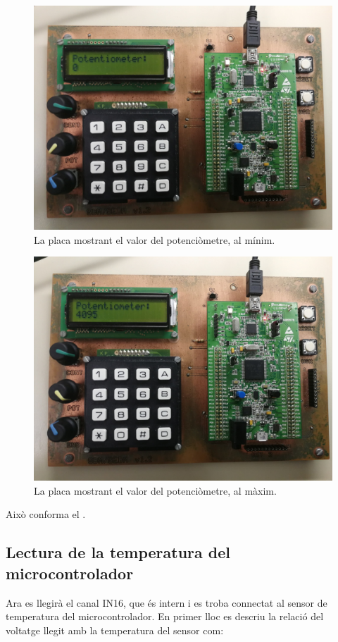 \begin{figure}[p] %
  \includegraphics[width=.82\columnwidth]{../photos/board/c2-pot-zero_1}
  \caption{ \label{fig:c2-board-pot-zero} La placa mostrant el valor del potenciòmetre, al mínim. }
\end{figure}
\begin{figure}[p]
  \includegraphics[width=.82\columnwidth]{../photos/board/c2-pot-full}
  \caption{ \label{fig:c2-board-pot-full} La placa mostrant el valor del potenciòmetre, al màxim. }
\end{figure}

Això conforma el .


\subsection{Lectura de la temperatura del microcontrolador}

Ara es llegirà el canal IN16, que és intern i es troba connectat al
sensor de temperatura del microcontrolador. En primer lloc es descriu
la relació del voltatge llegit amb la temperatura del sensor com:

